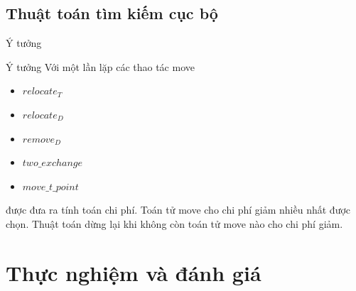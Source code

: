 \documentclass[compress]{beamer}
\begin{document}
\subsection{Thuật toán tìm kiếm cục bộ}
\begin{frame}{Ý tưởng}

\begin{block}{Ý tưởng}
Với một lần lặp các thao tác move
\begin{itemize}
\item $relocate_T$
\item $relocate_D$
\item $remove_D$
\item $two\_exchange$
\item $move\_t\_point$
\end{itemize}
được đưa ra tính toán chi phí. Toán tử move cho chi phí giảm nhiều nhất được chọn. Thuật toán dừng lại khi không còn toán tử move nào cho chi phí giảm.
\end{block}

\end{frame}
\section{Thực nghiệm và đánh giá}
\end{document}
